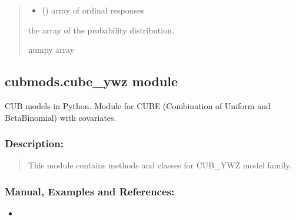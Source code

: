 \documentclass[letterpaper,10pt,english]{sphinxmanual}
\begin{document}
\begin{fulllineitems}
\begin{quote}
\begin{description}
\begin{itemize}
\item {} 
\sphinxAtStartPar
{} () \textendash{} array of ordinal responses

\end{itemize}

\sphinxAtStartPar
the array of the probability distribution.

\sphinxAtStartPar
numpy array

\end{description}\end{quote}

\end{fulllineitems}



\subsection{cubmods.cube\_ywz module}
\label{\detokenize{cubmods:module-cubmods.cube_ywz}}\label{\detokenize{cubmods:cubmods-cube-ywz-module}}\label{\detokenize{cubmods:cubeywz-module}}
\sphinxAtStartPar
CUB models in Python.
Module for CUBE (Combination of Uniform
and Beta\sphinxhyphen{}Binomial) with covariates.


\subsubsection{Description:}
\label{\detokenize{cubmods:id26}}\begin{quote}

\sphinxAtStartPar
This module contains methods and classes
for CUB\_YWZ model family.
\end{quote}


\subsubsection{Manual, Examples and References:}
\label{\detokenize{cubmods:id27}}\begin{itemize}
\item {} 
\sphinxAtStartPar
{}

\end{itemize}
\end{document}
